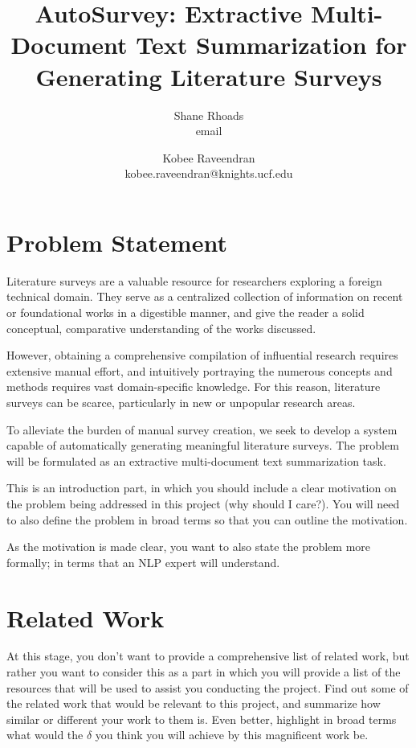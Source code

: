 \documentclass[conference]{sig-alternate-05-2015}
\begin{document}
\title{AutoSurvey: Extractive Multi-Document Text Summarization for Generating Literature Surveys}


\author{Shane Rhoads\\ email \and Kobee Raveendran  \\ kobee.raveendran@knights.ucf.edu}

\maketitle

\section{Problem Statement}

Literature surveys are a valuable resource for researchers exploring a foreign technical domain. They serve as a 
centralized collection of information on recent or foundational works in a digestible manner, and give the reader 
a solid conceptual, comparative understanding of the works discussed. 

However, obtaining a comprehensive compilation of influential research requires extensive manual effort, and intuitively 
portraying the numerous concepts and methods requires vast domain-specific knowledge. For this reason, literature 
surveys can be scarce, particularly in new or unpopular research areas.

To alleviate the burden of manual survey creation, we seek to develop a system capable of automatically generating meaningful
 literature surveys. The problem will be formulated as an extractive multi-document text summarization task.

This is an introduction part, in which you should include a clear motivation on the problem being addressed in this project (why should I care?). You will need to also define the problem in broad terms so that you can outline the motivation. 

As the motivation is made clear, you want to also state the problem more formally; in terms that an NLP expert will understand. 


\section{Related Work}\label{sec:related}
At this stage, you don't want to provide a comprehensive list of related work, but rather you want to consider this as a part in which you will provide a list of the resources that will be used to assist you conducting the project. Find out some of the related work that would be relevant to this project, and summarize how similar or different your work to them is. Even better, highlight in broad terms what would the $\delta$ you think you will achieve by this magnificent work be. 
\end{document}
